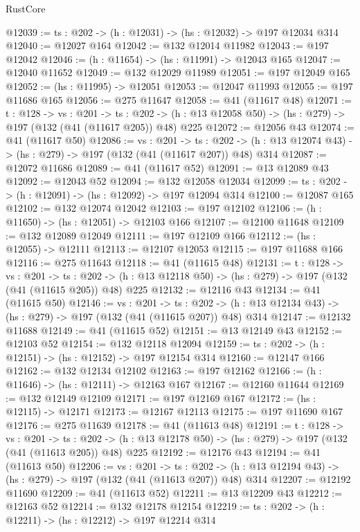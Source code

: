 \begin{lexlean}{RustCore}
\begin{coremodule}
@12039 := {ts : @202} -> (h : @12031) -> (hs : @12032) -> @197 @12034 @314
@12040 := @12027 @164
@12042 := @132 @12014 @11982
@12043 := @197 @12042
@12046 := (h : @11654) -> (hs : @11991) -> @12043 @165
@12047 := @12040 @11652
@12049 := @132 @12029 @11989
@12051 := @197 @12049 @165
@12052 := (hs : @11995) -> @12051
@12053 := @12047 @11993
@12055 := @197 @11686 @165
@12056 := @275 @11647
@12058 := @41 (@11617 @48)
@12071 := {t : @128} ->
  {vs : @201} ->
  {ts : @202} -> (h : @13 @12058 @50) -> (hs : @279) -> @197 (@132 (@41 (@11617 @205)) @48) @225
@12072 := @12056 @43
@12074 := @41 (@11617 @50)
@12086 := {vs : @201} ->
  {ts : @202} -> (h : @13 @12074 @43) -> (hs : @279) -> @197 (@132 (@41 (@11617 @207)) @48) @314
@12087 := @12072 @11686
@12089 := @41 (@11617 @52)
@12091 := @13 @12089 @43
@12092 := @12043 @52
@12094 := @132 @12058 @12034
@12099 := {ts : @202} -> (h : @12091) -> (hs : @12092) -> @197 @12094 @314
@12100 := @12087 @165
@12102 := @132 @12074 @12042
@12103 := @197 @12102
@12106 := (h : @11650) -> (hs : @12051) -> @12103 @166
@12107 := @12100 @11648
@12109 := @132 @12089 @12049
@12111 := @197 @12109 @166
@12112 := (hs : @12055) -> @12111
@12113 := @12107 @12053
@12115 := @197 @11688 @166
@12116 := @275 @11643
@12118 := @41 (@11615 @48)
@12131 := {t : @128} ->
  {vs : @201} ->
  {ts : @202} -> (h : @13 @12118 @50) -> (hs : @279) -> @197 (@132 (@41 (@11615 @205)) @48) @225
@12132 := @12116 @43
@12134 := @41 (@11615 @50)
@12146 := {vs : @201} ->
  {ts : @202} -> (h : @13 @12134 @43) -> (hs : @279) -> @197 (@132 (@41 (@11615 @207)) @48) @314
@12147 := @12132 @11688
@12149 := @41 (@11615 @52)
@12151 := @13 @12149 @43
@12152 := @12103 @52
@12154 := @132 @12118 @12094
@12159 := {ts : @202} -> (h : @12151) -> (hs : @12152) -> @197 @12154 @314
@12160 := @12147 @166
@12162 := @132 @12134 @12102
@12163 := @197 @12162
@12166 := (h : @11646) -> (hs : @12111) -> @12163 @167
@12167 := @12160 @11644
@12169 := @132 @12149 @12109
@12171 := @197 @12169 @167
@12172 := (hs : @12115) -> @12171
@12173 := @12167 @12113
@12175 := @197 @11690 @167
@12176 := @275 @11639
@12178 := @41 (@11613 @48)
@12191 := {t : @128} ->
  {vs : @201} ->
  {ts : @202} -> (h : @13 @12178 @50) -> (hs : @279) -> @197 (@132 (@41 (@11613 @205)) @48) @225
@12192 := @12176 @43
@12194 := @41 (@11613 @50)
@12206 := {vs : @201} ->
  {ts : @202} -> (h : @13 @12194 @43) -> (hs : @279) -> @197 (@132 (@41 (@11613 @207)) @48) @314
@12207 := @12192 @11690
@12209 := @41 (@11613 @52)
@12211 := @13 @12209 @43
@12212 := @12163 @52
@12214 := @132 @12178 @12154
@12219 := {ts : @202} -> (h : @12211) -> (hs : @12212) -> @197 @12214 @314

\end{coremodule}
\end{lexlean}
